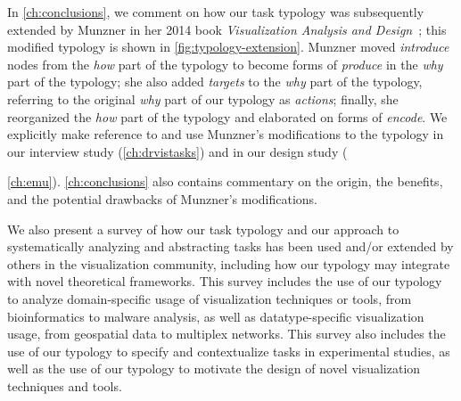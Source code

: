 In \autoref{ch:conclusions}, we comment on how our task typology was subsequently extended by Munzner in her 2014 book {\it Visualization Analysis and Design}~\cite{Munzner2014}; this modified typology is shown in \autoref{fig:typology-extension}.
Munzner moved {\it introduce} nodes from the {\it how} part of the typology to become forms of {\it produce} in the {\it why} part of the typology; she also added {\it targets} to the {\it why} part of the typology, referring to the original {\it why} part of our typology as {\it actions}; finally, she reorganized the {\it how} part of the typology and elaborated on forms of {\it encode}.
We explicitly make reference to and use Munzner's modifications to the typology in our interview study  (\autoref{ch:drvistasks}) and in our design study ({\autoref{ch:emu}).
\autoref{ch:conclusions} also contains commentary on the origin, the benefits, and the potential drawbacks of Munzner's modifications.

We also present a survey of how our task typology and our approach to systematically analyzing and abstracting tasks has been used and/or extended by others in the visualization community, including how our typology may integrate with novel theoretical frameworks.
This survey includes the use of our typology to analyze domain-specific usage of visualization techniques or tools, from bioinformatics to malware analysis, as well as datatype-specific visualization usage, from geospatial data to multiplex networks.
This survey also includes the use of our typology to specify and contextualize tasks in experimental studies, as well as the use of our typology to motivate the design of novel visualization techniques and tools.


}
